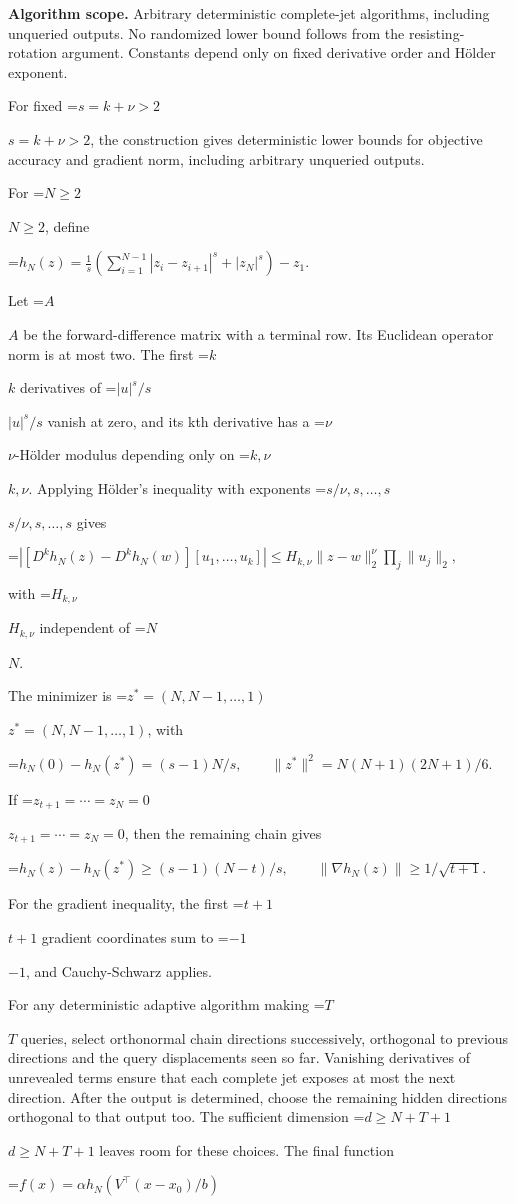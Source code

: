 \documentclass[10pt,a4paper]{article}
\newcommand{\AtlasMath}[1]{\par\begingroup\centering\setbox0=\hbox{$\displaystyle #1$}\ifdim\wd0>1.4\linewidth\typeout{ATLAS WIDE FORMULA: \the\wd0}\fi\ifdim\wd0>\linewidth\resizebox{\linewidth}{!}{\box0}\else\box0\fi\par\endgroup}
\newcommand{\AtlasInlineMath}[1]{\begingroup\setbox0=\hbox{$#1$}\ifdim\wd0>.4\linewidth\endgroup\AtlasMath{#1}\else\endgroup$#1$\fi}
\begin{document}
\textbf{Algorithm scope.} Arbitrary deterministic complete-jet algorithms, including unqueried outputs. No randomized lower bound follows from the resisting-rotation argument. Constants depend only on fixed derivative order and Hölder exponent.

For fixed \AtlasInlineMath{s=k+\nu>2}, the construction gives deterministic lower bounds for objective accuracy and gradient norm, including arbitrary unqueried outputs.

For \AtlasInlineMath{N\ge2}, define

\AtlasMath{h_N(z)=\frac1s\left(\sum_{i=1}^{N-1}|z_i-z_{i+1}|^s+|z_N|^s\right)-z_1.}

Let \AtlasInlineMath{A} be the forward-difference matrix with a terminal row. Its Euclidean operator norm is at most two. The first \AtlasInlineMath{k} derivatives of \AtlasInlineMath{|u|^s/s} vanish at zero, and its kth derivative has a \AtlasInlineMath{\nu}-Hölder modulus depending only on \AtlasInlineMath{k,\nu}. Applying Hölder's inequality with exponents \AtlasInlineMath{s/\nu,s,\ldots,s} gives

\AtlasMath{|[D^kh_N(z)-D^kh_N(w)][u_1,\ldots,u_k]|
\le H_{k,\nu}\|z-w\|_2^\nu\prod_j\|u_j\|_2,}

with \AtlasInlineMath{H_{k,\nu}} independent of \AtlasInlineMath{N}.

The minimizer is \AtlasInlineMath{z^*=(N,N-1,\ldots,1)}, with

\AtlasMath{h_N(0)-h_N(z^*)=(s-1)N/s,\qquad
\|z^*\|^2=N(N+1)(2N+1)/6.}

If \AtlasInlineMath{z_{t+1}=\cdots=z_N=0}, then the remaining chain gives

\AtlasMath{h_N(z)-h_N(z^*)\ge(s-1)(N-t)/s,\qquad
\|\nabla h_N(z)\|\ge1/\sqrt{t+1}.}

For the gradient inequality, the first \AtlasInlineMath{t+1} gradient coordinates sum to \AtlasInlineMath{-1}, and Cauchy-Schwarz applies.

For any deterministic adaptive algorithm making \AtlasInlineMath{T} queries, select orthonormal chain directions successively, orthogonal to previous directions and the query displacements seen so far. Vanishing derivatives of unrevealed terms ensure that each complete jet exposes at most the next direction. After the output is determined, choose the remaining hidden directions orthogonal to that output too. The sufficient dimension \AtlasInlineMath{d\ge N+T+1} leaves room for these choices. The final function

\AtlasMath{f(x)=\alpha h_N(V^\top(x-x_0)/b)}
\end{document}

